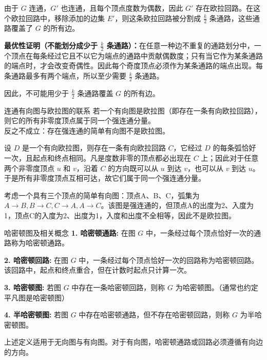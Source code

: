 由于 $G$ 连通，$G'$ 也连通，且每个顶点度数为偶数，因此 $G'$ 存在欧拉回路。在这个欧拉回路中，移除添加的边集 $E'$，则这条欧拉回路被分割成 $\frac{k}{2}$ 条通路，这些通路覆盖了 $G$ 的所有边。
    
\textbf{最优性证明（不能划分成少于 $\frac{k}{2}$ 条通路）：}在任意一种边不重复的通路划分中，一个顶点在每条经过它且不以它为端点的通路中贡献偶数度；只有当它作为某条通路的端点时，才会改变奇偶性。因此每个奇度顶点必须作为某条通路的端点出现。每条通路最多有两个端点，所以至少需要 $\frac{k}{2}$ 条通路。
    
因此，不可能用少于 $\frac{k}{2}$ 条通路覆盖 $G$ 的所有边。
\begin{theorem}{连通有向图与欧拉图的联系}{}
若一个有向图是欧拉图（即存在一条有向欧拉回路），则它的所有非零度顶点属于同一个强连通分量。\\
反之不成立：存在强连通的简单有向图不是欧拉图。
\end{theorem}
设 $D$ 是一个有向欧拉图，则存在一条有向欧拉回路 $C$，它经过 $D$ 的每条弧恰好一次，且起点和终点相同。凡是度数非零的顶点都必出现在 $C$ 上；因此对于任意两个非零度顶点 $u$ 和 $v$，沿着 $C$ 的方向既可以从 $u$ 到达 $v$，也可以从 $v$ 到达 $u$。于是所有非零度顶点互相可达，故它们属于同一个强连通分量。

考虑一个具有三个顶点的简单有向图：顶点A、B、C，弧集为$A\to B,B\to C,C\to A,A\to C$。该图是强连通的，但顶点A的出度为2、入度为1，顶点C的入度为2、出度为1，入度和出度不全相等，因此不是欧拉图。
\begin{definition}{哈密顿图及相关概念}{}
    \textbf{1. 哈密顿通路:}
    在图 $G$ 中，一条经过每个顶点恰好一次的通路称为哈密顿通路。

    \textbf{2. 哈密顿回路:}
    在图 $G$ 中，一条经过每个顶点恰好一次的回路称为哈密顿回路。该回路中，起点和终点重合，但在计数时起点只计算一次。

    \textbf{3. 哈密顿图:}
    若图 $G$ 中存在一条哈密顿回路，则称 $G$ 为哈密顿图。（通常也约定平凡图是哈密顿图）

    \textbf{4. 半哈密顿图:}
    若图 $G$ 中存在哈密顿通路，但不存在哈密顿回路，则称 $G$ 为半哈密顿图。
\end{definition}
上述定义适用于无向图与有向图。对于有向图，哈密顿通路或回路必须遵循有向边的方向。


